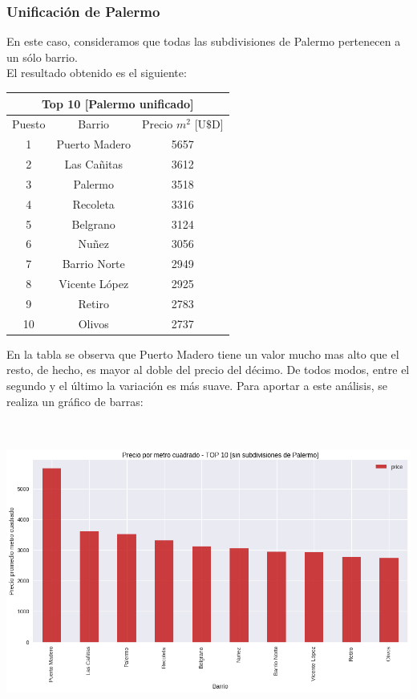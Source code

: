\documentclass[a4paper, 10pt]{article}
\newcommand\tab[1][0.5cm]{\hspace*{#1}}
\begin{document}
				\subsubsection{Unificación de Palermo}
					En este caso, consideramos que todas las subdivisiones de Palermo pertenecen a un sólo barrio.\\
					\tab El resultado obtenido es el siguiente:
					\begin{center}
						\begin{tabular}{ |c|c|c| }
							\hline
							\multicolumn{3}{|c|}{Top 10 [Palermo unificado]}\\
							\hline
							\hline
							Puesto & Barrio & Precio $m^2$ [U$\$$D] \\
							\hline
							1 & Puerto Madero & 5657 \\
							2 & Las Cañitas & 3612 \\
							3 & Palermo & 3518 \\
							4 & Recoleta & 3316 \\
							5 & Belgrano & 3124 \\
							6 & Nuñez & 3056 \\
							7 & Barrio Norte & 2949 \\
							8 & Vicente López & 2925 \\
							9 & Retiro & 2783 \\
							10 & Olivos & 2737 \\
							\hline
						\end{tabular}
					\end{center}
					\tab En la tabla se observa que Puerto Madero tiene un valor mucho mas alto que el resto, de hecho, es
					mayor al doble del precio del décimo. De todos modos, entre el segundo y el último la variación es más
					suave. Para aportar a este análisis, se realiza un gráfico de barras:
					\begin{center}
   	    					\includegraphics[width=6in, height=3.9in]{images/m2UnifiedTop10}
			  		\end{center}	
\end{document}
